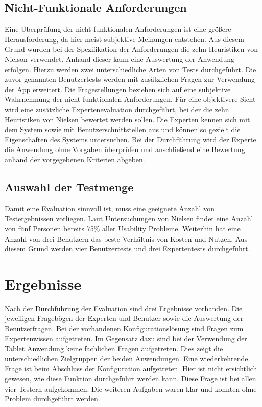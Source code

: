 \subsection{Nicht-Funktionale Anforderungen}
Eine Überprüfung der nicht-funktionalen Anforderungen ist eine größere Herausforderung, da hier meist subjektive Meinungen entstehen. Aus diesem Grund wurden bei der Spezifikation der Anforderungen die zehn Heuristiken von Nielson verwendet. Anhand dieser kann eine Auswertung der Anwendung erfolgen. Hierzu werden zwei unterschiedliche Arten von Tests durchgeführt. Die zuvor genannten Benutzertests werden mit zusätzlichen Fragen zur Verwendung der App erweitert. Die Fragestellungen beziehen sich auf eine subjektive Wahrnehmung der nicht-funktionalen Anforderungen. Für eine objektivere Sicht wird eine zusätzliche Expertenevaluation durchgeführt, bei der die zehn Heuristiken von Nielsen bewertet werden sollen. Die Experten kennen sich mit dem System sowie mit Benutzerschnittstellen aus und können so gezielt die Eigenschaften des Systems untersuchen. Bei der Durchführung wird der Experte die Anwendung ohne Vorgaben überprüfen und anschließend eine Bewertung anhand der vorgegebenen Kriterien abgeben. 

\subsection{Auswahl der Testmenge}
Damit eine Evaluation sinnvoll ist, muss eine geeignete Anzahl von Testergebnissen vorliegen. Laut Untersuchungen von Nielsen \cite{bib:countTests} findet eine Anzahl von fünf Personen bereits 75\% aller Usability Probleme. Weiterhin hat eine Anzahl von drei Benutzern das beste Verhältnis von Kosten und Nutzen. Aus diesem Grund werden vier Benutzertests und drei Expertentests durchgeführt. 

\section{Ergebnisse}
Nach der Durchführung der Evaluation sind drei Ergebnisse vorhanden. Die jeweiligen Fragebögen der Experten und Benutzer sowie die Auswertung der Benutzerfragen. Bei der vorhandenen Konfigurationslösung sind Fragen zum Expertenwissen aufgetreten. Im Gegensatz dazu sind bei der Verwendung der Tablet Anwendung keine fachlichen Fragen aufgetreten. Dies zeigt die unterschiedlichen Zielgruppen der beiden Anwendungen. Eine wiederkehrende Frage ist beim Abschluss der Konfiguration aufgetreten. Hier ist nicht ersichtlich gewesen, wie diese Funktion durchgeführt werden kann. Diese Frage ist bei allen vier Testern aufgekommen. Die weiteren Aufgaben waren klar und konnten ohne Problem durchgeführt werden. 



